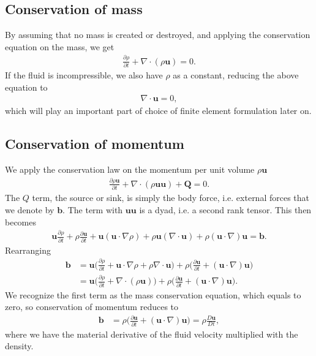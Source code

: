 \documentclass[a4paper,10pt]{article}
\renewcommand{\vec}[1]{\mathbf{#1}}
\renewcommand{\(}{\left(}
\renewcommand{\)}{\right)}
\newcommand{\dpart}[2]{\frac{\partial#1}{\partial#2}}
\begin{document}
\subsection{Conservation of mass}
By assuming that no mass is created or destroyed, and applying the conservation equation on the mass, we get
\begin{align*}
  \dpart{\rho}{t} + \nabla \cdot (\rho\vec u) = 0.
\end{align*}
If the fluid is incompressible, we also have $\rho$ as a constant, reducing the above equation to
\begin{align}
  \label{eq:incompressible_fluid}
  \nabla \cdot \vec u = 0,
\end{align}
which will play an important part of choice of finite element formulation later on. 

\subsection{Conservation of momentum}
We apply the conservation law on the momentum per unit volume $\rho\vec u$
\begin{align*}
  \dpart{\rho\vec u}{t} + \nabla \cdot (\rho\vec u\vec u) + \vec Q = 0.
\end{align*}
The $Q$ term, the source or sink, is simply the body force, i.e. external forces that we denote by $\vec b$. The term with $\vec u\vec u$ is a dyad, i.e. a second rank tensor. This then becomes
\begin{align*}
  \vec u\dpart{\rho}{t} + \rho\dpart{\vec u}{t} + \vec u(\vec u\cdot\nabla \rho) + \rho\vec u(\nabla\cdot \vec u) + \rho(\vec u\cdot \nabla) \vec u = \vec b.
\end{align*}
Rearranging
\begin{align*}
  \vec b &= \vec u\Big(\dpart{\rho}{t} + \vec u\cdot \nabla \rho + \rho\nabla \cdot \vec u \Big) + \rho\Big( \dpart{\vec u}{t} + (\vec u\cdot \nabla) \vec u \Big)\\
  &= \vec u\Big(\dpart{\rho}{t} + \nabla\cdot(\rho\vec u) \Big) + \rho\Big( \dpart{\vec u}{t} + (\vec u\cdot \nabla) \vec u \Big).
\end{align*}
We recognize the first term as the mass conservation equation, which equals to zero, so conservation of momentum reduces to
\begin{align*}
  \vec b &= \rho\Big( \dpart{\vec u}{t} + (\vec u\cdot \nabla) \vec u \Big) = \rho\frac{D\vec u}{Dt},
\end{align*}
 where we have the material derivative of the fluid velocity multiplied with the density.
\end{document}
